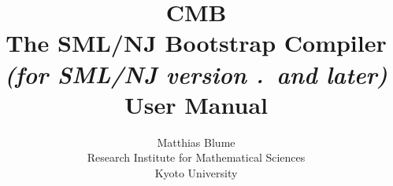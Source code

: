 \documentclass[titlepage,letterpaper]{article}
\author{Matthias Blume \\
Research Institute for Mathematical Sciences \\
Kyoto University}
\title{{\bf CMB}\\
The SML/NJ Bootstrap Compiler \\
{\it\small (for SML/NJ version \smlmj.\smlmn~and later)} \\
User Manual}
\begin{document}


\maketitle

\pagebreak

\tableofcontents

\pagebreak








\pagebreak


\end{document}
